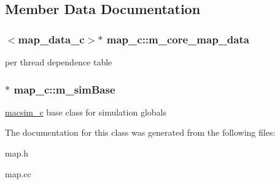 \subsection{Member Data Documentation}
\hypertarget{classmap__c_af14fbb514a865af51d89f827d72d17f3}{
\subsubsection[{m\_\-core\_\-map\_\-data}]{$<${\bf map\_\-data\_\-c}$>$$\ast$ {\bf map\_\-c::m\_\-core\_\-map\_\-data}}}
\label{classmap__c_af14fbb514a865af51d89f827d72d17f3}
per thread dependence table \hypertarget{classmap__c_ad004224b761c096deeeaca078b2ba22d}{
\subsubsection[{m\_\-simBase}]{$\ast$ {\bf map\_\-c::m\_\-simBase}}}
\label{classmap__c_ad004224b761c096deeeaca078b2ba22d}
\hyperlink{classmacsim__c}{macsim\_\-c} base class for simulation globals 

The documentation for this class was generated from the following files:\begin{DoxyCompactItemize}
\item 
map.h\item 
map.cc\end{DoxyCompactItemize}
